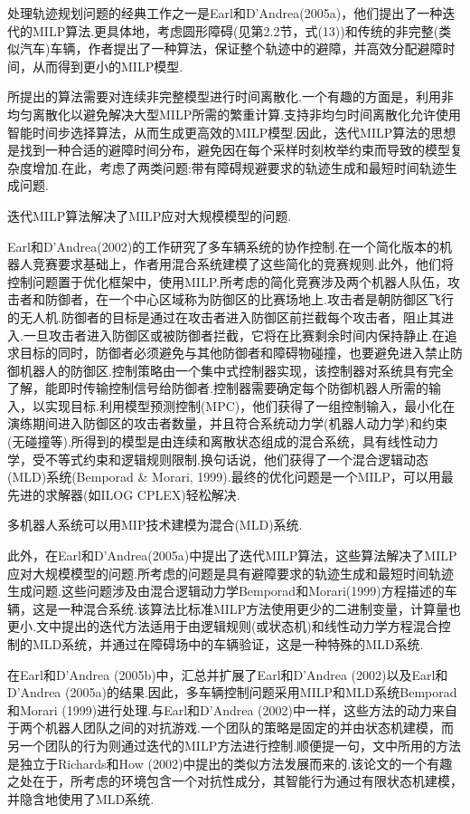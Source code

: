 \documentclass[10pt]{article}
\begin{document}
处理轨迹规划问题的经典工作之一是Earl和D'Andrea(2005a)，他们提出了一种迭代的MILP算法.更具体地，考虑圆形障碍(见第2.2节，式(13))和传统的非完整(类似汽车)车辆，作者提出了一种算法，保证整个轨迹中的避障，并高效分配避障时间，从而得到更小的MILP模型.

所提出的算法需要对连续非完整模型进行时间离散化.一个有趣的方面是，利用非均匀离散化以避免解决大型MILP所需的繁重计算.支持非均匀时间离散化允许使用智能时间步选择算法，从而生成更高效的MILP模型.因此，迭代MILP算法的思想是找到一种合适的避障时间分布，避免因在每个采样时刻枚举约束而导致的模型复杂度增加.在此，考虑了两类问题:带有障碍规避要求的轨迹生成和最短时间轨迹生成问题.

迭代MILP算法解决了MILP应对大规模模型的问题.

Earl和D'Andrea(2002)的工作研究了多车辆系统的协作控制.在一个简化版本的机器人竞赛要求基础上，作者用混合系统建模了这些简化的竞赛规则.此外，他们将控制问题置于优化框架中，使用MILP.所考虑的简化竞赛涉及两个机器人队伍，攻击者和防御者，在一个中心区域称为防御区的比赛场地上.攻击者是朝防御区飞行的无人机.防御者的目标是通过在攻击者进入防御区前拦截每个攻击者，阻止其进入.一旦攻击者进入防御区或被防御者拦截，它将在比赛剩余时间内保持静止.在追求目标的同时，防御者必须避免与其他防御者和障碍物碰撞，也要避免进入禁止防御机器人的防御区.控制策略由一个集中式控制器实现，该控制器对系统具有完全了解，能即时传输控制信号给防御者.控制器需要确定每个防御机器人所需的输入，以实现目标.利用模型预测控制(MPC)，他们获得了一组控制输入，最小化在演练期间进入防御区的攻击者数量，并且符合系统动力学(机器人动力学)和约束(无碰撞等).所得到的模型是由连续和离散状态组成的混合系统，具有线性动力学，受不等式约束和逻辑规则限制.换句话说，他们获得了一个混合逻辑动态(MLD)系统(Bemporad \& Morari, 1999).最终的优化问题是一个MILP，可以用最先进的求解器(如ILOG CPLEX)轻松解决.

多机器人系统可以用MIP技术建模为混合(MLD)系统.

此外，在Earl和D'Andrea(2005a)中提出了迭代MILP算法，这些算法解决了MILP应对大规模模型的问题.所考虑的问题是具有避障要求的轨迹生成和最短时间轨迹生成问题.这些问题涉及由混合逻辑动力学Bemporad和Morari(1999)方程描述的车辆，这是一种混合系统.该算法比标准MILP方法使用更少的二进制变量，计算量也更小.文中提出的迭代方法适用于由逻辑规则(或状态机)和线性动力学方程混合控制的MLD系统，并通过在障碍场中的车辆验证，这是一种特殊的MLD系统.

在Earl和D'Andrea (2005b)中，汇总并扩展了Earl和D'Andrea (2002)以及Earl和D'Andrea (2005a)的结果.因此，多车辆控制问题采用MILP和MLD系统Bemporad和Morari (1999)进行处理.与Earl和D'Andrea (2002)中一样，这些方法的动力来自于两个机器人团队之间的对抗游戏.一个团队的策略是固定的并由状态机建模，而另一个团队的行为则通过迭代的MILP方法进行控制.顺便提一句，文中所用的方法是独立于Richards和How (2002)中提出的类似方法发展而来的.该论文的一个有趣之处在于，所考虑的环境包含一个对抗性成分，其智能行为通过有限状态机建模，并隐含地使用了MLD系统.
\end{document}
